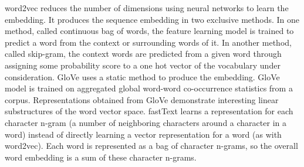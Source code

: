 \documentclass[oneside, twocolumn, a4paper, 10pt]{IEEEtran}
\begin{document}
\par 
word2vec reduces the number of dimensions using neural networks to learn the embedding. It produces the sequence embedding in two exclusive methods. In one method, called continuous bag of words, the feature learning model is trained to predict a word from the context or surrounding words of it. In another method, called skip-gram, the context words are predicted from a given word through assigning some probability score to a one hot vector of the vocabulary under consideration. GloVe uses a static method to produce the embedding. GloVe model is trained on aggregated global word-word co-occurrence statistics from a corpus. Representations obtained from GloVe demonstrate interesting linear substructures of the word vector space. fastText learns a representation for each character n-gram (a number of neighboring characters around a character in a word) instead of directly learning a vector representation for a word (as with word2vec). Each word is represented as a bag of character n-grams, so the overall word embedding is a sum of these character n-grams.
\end{document}
